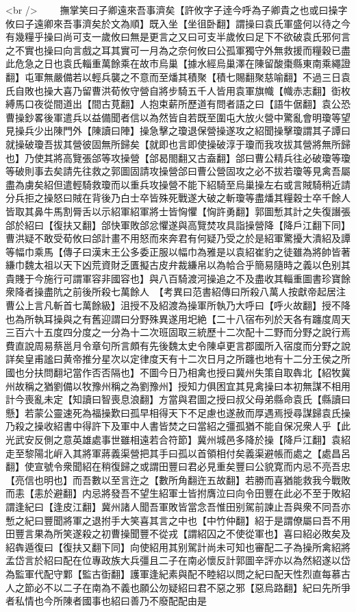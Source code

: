 <br />
　　撫掌笑曰子卿遠來吾事濟矣【許攸字子逹今呼為子卿貴之也或曰操字攸曰子遠卿來吾事濟矣於文為順】既入坐【坐徂卧翻】謂操曰袁氏軍盛何以待之今有幾糧乎操曰尚可支一歲攸曰無是更言之又曰可支半歲攸曰足下不欲破袁氏邪何言之不實也操曰向言戲之耳其實可一月為之奈何攸曰公孤軍獨守外無救援而糧穀已盡此危急之日也袁氏輜重萬餘乘在故市烏巢【據水經烏巢澤在陳留酸棗縣東南乘繩證翻】屯軍無嚴備若以輕兵襲之不意而至燔其積聚【積七賜翻聚慈喻翻】不過三日袁氏自敗也操大喜乃留曹洪荀攸守營自將步騎五千人皆用袁軍旗幟【幟赤志翻】衘枚縛馬口夜從間道出【間古莧翻】人抱束薪所歷道有問者語之曰【語牛倨翻】袁公恐曹操鈔畧後軍遣兵以益備聞者信以為然皆自若既至圍屯大放火營中驚亂會明瓊等望見操兵少出陳門外【陳讀曰陣】操急擊之瓊退保營操遂攻之紹聞操擊瓊謂其子譚曰就操破瓊吾拔其營彼固無所歸矣【就即也言即使操破淳于瓊而我攻拔其營將無所歸也】乃使其將高覽張郃等攻操營【郃曷閤翻又古盍翻】郃曰曹公精兵往必破瓊等瓊等破則事去矣請先往救之郭圖固請攻操營郃曰曹公營固攻之必不拔若瓊等見禽吾屬盡為虜矣紹但遣輕騎救瓊而以重兵攻操營不能下紹騎至烏巢操左右或言賊騎稍近請分兵拒之操怒曰賊在背後乃白士卒皆殊死戰遂大破之斬瓊等盡燔其糧穀士卒千餘人皆取其鼻牛馬割脣舌以示紹軍紹軍將士皆恟懼【恟許勇翻】郭圖慙其計之失復譖張郃於紹曰【復扶又翻】郃快軍敗郃忿懼遂與高覽焚攻具詣操營降【降戶江翻下同】曹洪疑不敢受荀攸曰郃計畫不用怒而來奔君有何疑乃受之於是紹軍驚擾大潰紹及譚等幅巾乘馬【傳子曰漢末王公多委正服以幅巾為雅是以袁紹崔豹之徒雖為將帥皆著縑巾魏太祖以天下凶荒資財乏匱擬古皮弁裁縑帛以為帢合乎簡易隨時之義以色别其貴賤于今施行可謂軍容非國容也】與八百騎渡河操追之不及盡收其輜重圖書珍寶餘衆降者操盡阬之前後所殺七萬餘人　【考異曰范書紹傳曰所殺八萬人按獻帝起居注曹公上言凡斬首七萬餘級】沮授不及紹渡為操軍所執乃大呼曰【呼火故翻】授不降也為所執耳操與之有舊迎謂曰分野殊異遂用圯絶【二十八宿布列於天各有躔度周天三百六十五度四分度之一分為十二次班固取三統歷十二次配十二野而分野之說行焉費直說周易蔡邕月令章句所言頗有先後魏太史令陳卓更言郡國所入宿度而分野之說詳矣皇甫謐曰黄帝推分星次以定律度天有十二次日月之所躔也地有十二分王侯之所國也分扶問翻圮當作否否隔也】不圖今日乃相禽也授曰冀州失策自取犇北【紹牧冀州故稱之猶劉備以牧豫州稱之為劉豫州】授知力俱困宜其見禽操曰本初無謀不相用計今喪亂未定【知讀曰智喪息浪翻】方當與君圖之授曰叔父母弟縣命袁氏【縣讀曰懸】若蒙公靈速死為福操歎曰孤早相得天下不足慮也遂赦而厚遇焉授尋謀歸袁氏操乃殺之操收紹書中得許下及軍中人書皆焚之曰當紹之彊孤猶不能自保况衆人乎【此光武安反側之意英雄處事世雖相遠若合符節】冀州城邑多降於操【降戶江翻】袁紹走至黎陽北㟁入其將軍蔣義渠營把其手曰孤以首領相付矣義渠避帳而處之【處昌呂翻】使宣號令衆聞紹在稍復歸之或謂田豐曰君必見重矣豐曰公貌寛而内忌不亮吾忠【亮信也明也】而吾數以至言迕之【數所角翻迕五故翻】若勝而喜猶能救我今戰敗而恚【恚於避翻】内忌將發吾不望生紹軍士皆拊膺泣曰向令田豐在此必不至于敗紹謂逢紀曰【逢皮江翻】冀州諸人聞吾軍敗皆當念吾惟田别駕前諫止吾與衆不同吾亦慙之紀曰豐聞將軍之退拊手大笑喜其言之中也【中竹仲翻】紹于是謂僚屬曰吾不用田豐言果為所笑遂殺之初曹操聞豐不從戎【謂紹囚之不使從軍也】喜曰紹必敗矣及紹犇遁復曰【復扶又翻下同】向使紹用其别駕計尚未可知也審配二子為操所禽紹將孟岱言於紹曰配在位專政族大兵彊且二子在南必懷反計郭圖辛評亦以為然紹遂以岱為監軍代配守鄴【監古衘翻】護軍逢紀素與配不睦紹以問之紀曰配天性烈直每慕古人之節必不以二子在南為不義也願公勿疑紹曰君不惡之邪【惡烏路翻】紀曰先所爭者私情也今所陳者國事也紹曰善乃不廢配配由是